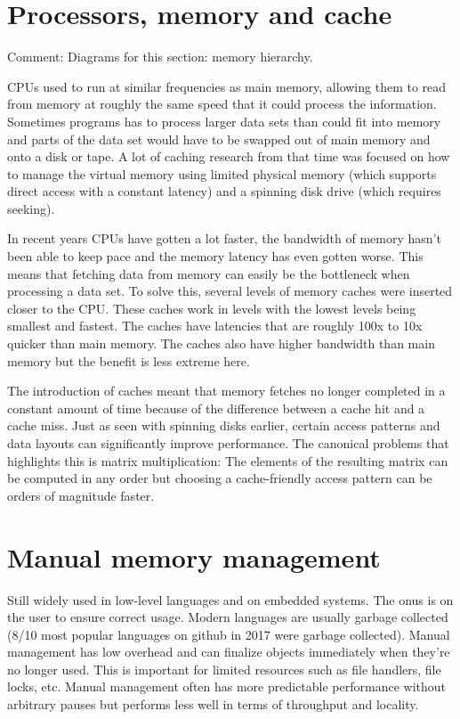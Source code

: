 \documentclass[a4paper,oneside]{memoir}
\newcommand{\makecomment}[1]{{\color{red} Comment: #1}}
\begin{document}
\section{Processors, memory and cache}
\makecomment{Diagrams for this section: memory hierarchy.}

CPUs used to run at similar frequencies as main memory, allowing them to read
from memory at roughly the same speed that it could process the information.
Sometimes programs has to process larger data sets than could fit into memory
and parts of the data set would have to be swapped out of main memory and onto
a disk or tape. A lot of caching research from that time was focused on how to
manage the virtual memory using limited physical memory (which supports direct
access with a constant latency) and a spinning disk drive (which requires seeking).

In recent years CPUs have gotten a lot faster, the bandwidth of memory
hasn't been able to keep pace and the memory latency has even gotten worse. This
means that fetching data from memory can easily be the bottleneck when processing
a data set. To solve this, several levels of memory caches were inserted closer
to the CPU. These caches work in levels with the lowest levels being smallest
and fastest. The caches have latencies that are roughly 100x to 10x quicker
than main memory. The caches also have higher bandwidth than main memory but
the benefit is less extreme here.

The introduction of caches meant that memory fetches no longer completed in a
constant amount of time because of the difference between a cache hit and
a cache miss. Just as seen with spinning disks earlier, certain access patterns
and data layouts can significantly improve performance. The canonical problems
that highlights this is matrix multiplication: The elements of the resulting
matrix can be computed in any order but choosing a cache-friendly access pattern
can be orders of magnitude faster.


\section{Manual memory management}
Still widely used in low-level languages and on embedded systems.
The onus is on the user to ensure correct usage.
Modern languages are usually garbage collected (8/10 most popular languages on
github\cite{GithubLanguages} in 2017 were garbage collected).
Manual management has low overhead and can finalize objects immediately when
they're no longer used. This is important for limited resources such as file
handlers, file locks, etc.
Manual management often has more predictable performance without arbitrary pauses
but performs less well in terms of throughput and locality.
\end{document}
